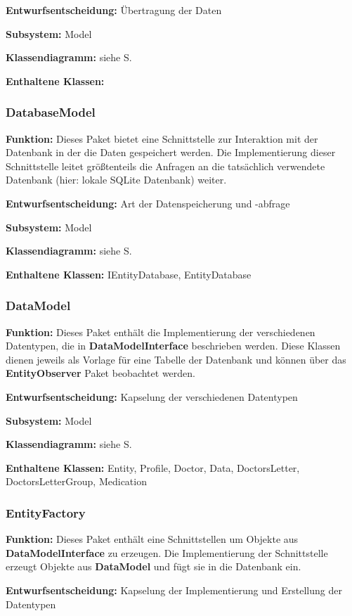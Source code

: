 \documentclass[a4paper]{scrreprt}
\begin{document}
\textbf{Entwurfsentscheidung:} Übertragung der Daten

\textbf{Subsystem:} Model

\textbf{Klassendiagramm:} siehe S.

\textbf{Enthaltene Klassen:} 

\subsubsection{DatabaseModel}
\textbf{Funktion:} Dieses Paket bietet eine Schnittstelle zur Interaktion mit der Datenbank in der die Daten gespeichert werden. 
Die Implementierung dieser Schnittstelle leitet größtenteils die Anfragen an die tatsächlich verwendete Datenbank (hier: lokale SQLite Datenbank) weiter.

\textbf{Entwurfsentscheidung:} Art der Datenspeicherung und -abfrage 

\textbf{Subsystem:} Model

\textbf{Klassendiagramm:} siehe S.

\textbf{Enthaltene Klassen:} IEntityDatabase, EntityDatabase

\subsubsection{DataModel}
\textbf{Funktion:} Dieses Paket enthält die Implementierung der verschiedenen Datentypen, die in \textbf{DataModelInterface} beschrieben werden. 
Diese Klassen dienen jeweils als Vorlage für eine Tabelle der Datenbank und können über das \textbf{EntityObserver} Paket beobachtet werden.

\textbf{Entwurfsentscheidung:} Kapselung der verschiedenen Datentypen

\textbf{Subsystem:} Model

\textbf{Klassendiagramm:} siehe S.

\textbf{Enthaltene Klassen:} Entity, Profile, Doctor, Data, DoctorsLetter, DoctorsLetterGroup, Medication

\subsubsection{EntityFactory}
\textbf{Funktion:} Dieses Paket enthält eine Schnittstellen um Objekte aus \textbf{DataModelInterface} zu erzeugen.
Die Implementierung der Schnittstelle erzeugt Objekte aus \textbf{DataModel} und fügt sie in die Datenbank ein.

\textbf{Entwurfsentscheidung:} Kapselung der Implementierung und Erstellung der Datentypen
\end{document}
